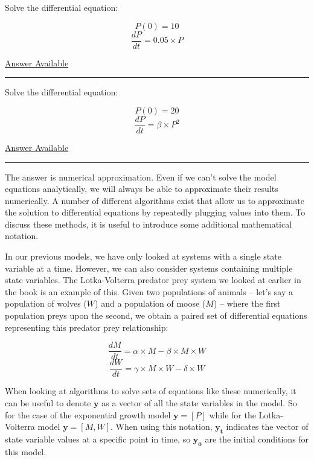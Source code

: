 \documentclass[]{memoir}
\begin{document}
Solve the differential equation:

\[ P(0) = 10 \] \[ \frac{dP}{dt} = 0.05 \times P \]

\hyperref[Ans-10-5]{Answer Available}

\begin{center}\rule{3in}{0.4pt}\end{center}


Solve the differential equation:

\[ P(0) = 20 \] \[ \frac{dP}{dt} = \beta \times P^2 \]

\hyperref[Ans-10-6]{Answer Available}

\begin{center}\rule{3in}{0.4pt}\end{center}

The answer is numerical approximation. Even if we can't solve the model
equations analytically, we will always be able to approximate their
results numerically. A number of different algorithms exist that allow
us to approximate the solution to differential equations by repeatedly
plugging values into them. To discuss these methods, it is useful to
introduce some additional mathematical notation.

In our previous models, we have only looked at systems with a single
state variable at a time. However, we can also consider systems
containing multiple state variables. The Lotka-Volterra predator prey
system we looked at earlier in the book is an example of this. Given two
populations of animals -- let's say a population of wolves ($W$) and a
population of moose ($M$) -- where the first population preys upon the
second, we obtain a paired set of differential equations representing
this predator prey relationship:

\[ \frac{dM}{dt} = \alpha \times M - \beta \times M \times W \]
\[ \frac{dW}{dt} = \gamma \times M \times W - \delta \times W  \]

When looking at algorithms to solve sets of equations like these
numerically, it can be useful to denote $\mathbf{y}$ as a vector of all
the state variables in the model. So for the case of the exponential
growth model $\mathbf{y}=[P]$ while for the Lotka-Volterra model
$\mathbf{y}=[M, W]$. When using this notation, $\mathbf{y_t}$ indicates
the vector of state variable values at a specific point in time, so
$\mathbf{y_0}$ are the initial conditions for this model.
\end{document}
